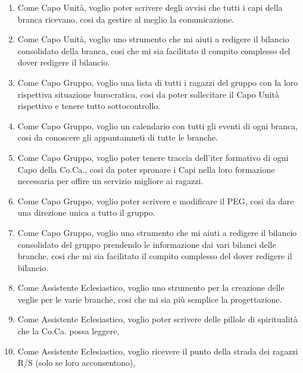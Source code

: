 \documentclass[11pt]{article}
\begin{document}
\begin{enumerate}
  \item Come Capo Unità, voglio poter scrivere degli avvisi che tutti i capi della branca ricevano, cosi da gestire al meglio la comunicazione.
  \item Come Capo Unità, voglio uno strumento che mi aiuti a redigere il bilancio consolidato della branca, cosi che mi sia facilitato il compito complesso del dover redigere il bilancio.
  \vspace{1cm}
  \item Come Capo Gruppo, voglio una lista di tutti i ragazzi del gruppo con la loro rispettiva situazione burocratica, cosi da poter sollecitare il Capo Unità rispettivo e tenere tutto sottocontrollo.
  \item Come Capo Gruppo, voglio un calendario con tutti gli eventi di ogni branca, cosi da conoscere gli appuntamneti di tutte le branche.
  \item Come Capo Gruppo, voglio poter tenere traccia dell'iter formativo di ogni Capo della Co.Ca., cosi da poter spronare i Capi nella loro formazione necessaria per offire un servizio migliore ai ragazzi.
  \item Come Capo Gruppo, voglio poter scrivere e modificare il PEG, cosi da dare una direzione unica a tutto il gruppo.
  \item Come Capo Gruppo, voglio uno strumento che mi aiuti a redigere il bilancio consolidato del gruppo prendendo le informazione dai vari bilanci delle branche,  cosi che mi sia facilitato il compito complesso del dover redigere il bilancio.
  \vspace{1cm}
  \item Come Assistente Eclesiastico, voglio uno strumento per la creazione delle veglie per le varie branche, cosi che mi sia più semplice la progettazione.
  \item Come Assistente Eclesiastico, voglio poter scrivere delle pillole di spiritualità che la Co.Ca. possa leggere, 
  \item Come Assistente Eclesiastico, voglio ricevere il punto della strada dei ragazzi R/S (solo se loro acconsentono),
\end{enumerate}
\end{document}
